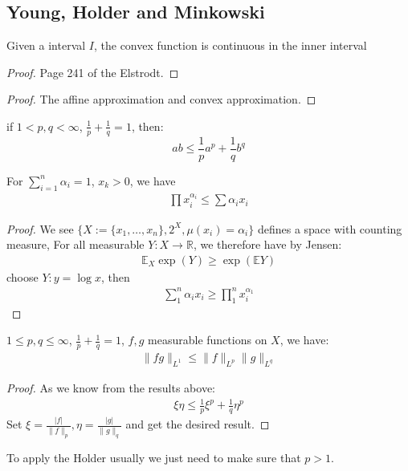 \subsection{Young, Holder and Minkowski}
\begin{proposition} Given a interval $I$, the convex function is continuous in the inner interval
\end{proposition}
\begin{proof}
	Page 241 of the Elstrodt.
\end{proof}

\begin{lemma}
\end{lemma}
\begin{proof}
	The affine approximation and convex approximation.
\end{proof}

\begin{lemma}
if $1 < p, q < \infty$, $\frac{1}{p} + \frac{1}{q} = 1$, then:
\begin{equation*}
	ab \leq \frac{1}{p}a^p + \frac{1}{q}b^q
\end{equation*}
\end{lemma}

\begin{example}
For $\sum_{i = 1}^n \alpha_i = 1$, $x_k > 0$, we have
	\begin{align*}
		\prod x_i^{\alpha_i} \leq \sum \alpha_i x_i 
	\end{align*}
\end{example}
\begin{proof}
	We see $\{ X := \{x_1, \dots, x_n\}, 2^X, \mu(x_i) = \alpha_i  \}$ defines a space with counting measure, For all measurable $Y: X \rightarrow\mathbb{R}$,  we therefore have by Jensen:
	\begin{align*}
		\mathbb{E}_X \exp(Y) \geq \exp(\mathbb{E} Y)
	\end{align*}
	choose $Y: y = \log x$, then
	\begin{align*}
		\sum_1^n \alpha_i x_i \geq \prod_1^n x_i^{\alpha_1} 
	\end{align*}
\end{proof}

\begin{lemma}
$1 \leq p, q \leq \infty$, $\frac{1}{p} + \frac{1}{q} = 1$, $f, g$ measurable functions on $X$, we have:
\begin{align*}
	\|fg\|_{L^1} \leq \|f\|_{L^p} \|g\|_{L^q}
\end{align*}
\end{lemma}
\begin{proof}
	As we know from the results above:
	\begin{align*}
		\xi \eta \leq \frac{1}{p}\xi^p + \frac{1}{q}\eta^p
	\end{align*}
	Set $\xi = \frac{|f|}{\|f\|_p}, \eta = \frac{|g|}{\|g\|_q}$ and get the desired result.
\end{proof}
\begin{remark}
To apply the Holder usually we just need to make sure that $p > 1$.	
\end{remark}



